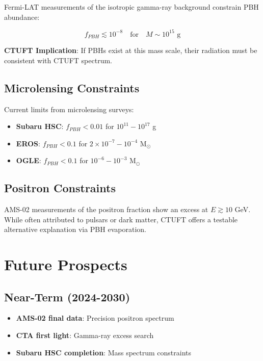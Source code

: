 Fermi-LAT measurements of the isotropic gamma-ray background constrain PBH abundance:

\begin{equation}
f_{PBH} \lesssim 10^{-8} \quad \text{for} \quad M \sim 10^{15} \text{ g}
\label{eq:cgb-constraint}
\end{equation}

\textbf{CTUFT Implication}: If PBHs exist at this mass scale, their radiation must be consistent with CTUFT spectrum.

\subsection{Microlensing Constraints}
\label{subsec:microlensing-constraints}

Current limits from microlensing surveys:

\begin{itemize}
    \item \textbf{Subaru HSC}: $f_{PBH} < 0.01$ for $10^{11} - 10^{17}$ g
    \item \textbf{EROS}: $f_{PBH} < 0.1$ for $2\times10^{-7} - 10^{-4}$ M$_\odot$
    \item \textbf{OGLE}: $f_{PBH} < 0.1$ for $10^{-6} - 10^{-3}$ M$_\odot$
\end{itemize}

\subsection{Positron Constraints}
\label{subsec:positron-constraints}

AMS-02 measurements of the positron fraction show an excess at $E \gtrsim 10$ GeV. While often attributed to pulsars or dark matter, CTUFT offers a testable alternative explanation via PBH evaporation.

\section{Future Prospects}
\label{sec:future-prospects}

\subsection{Near-Term (2024-2030)}
\label{subsec:near-term}

\begin{itemize}
    \item \textbf{AMS-02 final data}: Precision positron spectrum
    \item \textbf{CTA first light}: Gamma-ray excess search
    \item \textbf{Subaru HSC completion}: Mass spectrum constraints
\end{itemize}

